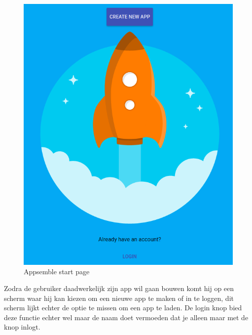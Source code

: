 \newline
\begin{figure}[H]
	\centering
	\includegraphics[scale=0.25]{images/appsemble_start_page}
	\caption{Appsemble start page}
\end{figure}
Zodra de gebruiker daadwerkelijk zijn app wil gaan bouwen komt hij op een scherm waar hij kan kiezen om een nieuwe app te maken of in te loggen, dit scherm lijkt  echter de optie te missen om een app te laden. De login knop bied deze functie echter wel maar de naam doet vermoeden dat je alleen maar met de knop inlogt.\\
\newline

